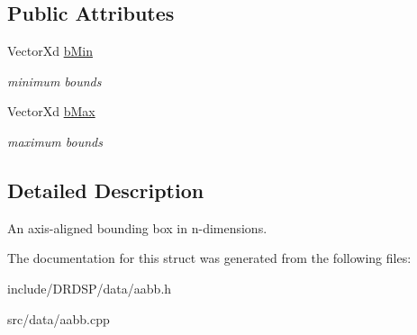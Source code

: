 \subsection*{Public Attributes}
\begin{DoxyCompactItemize}
\item 
\hypertarget{struct_d_r_d_s_p_1_1_a_a_b_b_a164c8db4daf154b8d0eb5d817849f0c1}{Vector\-Xd \hyperlink{struct_d_r_d_s_p_1_1_a_a_b_b_a164c8db4daf154b8d0eb5d817849f0c1}{b\-Min}}\label{struct_d_r_d_s_p_1_1_a_a_b_b_a164c8db4daf154b8d0eb5d817849f0c1}

\begin{DoxyCompactList}\small\item\em minimum bounds \end{DoxyCompactList}\item 
\hypertarget{struct_d_r_d_s_p_1_1_a_a_b_b_a429e3f5162a168b4611cd3b8c70150c1}{Vector\-Xd \hyperlink{struct_d_r_d_s_p_1_1_a_a_b_b_a429e3f5162a168b4611cd3b8c70150c1}{b\-Max}}\label{struct_d_r_d_s_p_1_1_a_a_b_b_a429e3f5162a168b4611cd3b8c70150c1}

\begin{DoxyCompactList}\small\item\em maximum bounds \end{DoxyCompactList}\end{DoxyCompactItemize}


\subsection{Detailed Description}
An axis-\/aligned bounding box in n-\/dimensions. 

The documentation for this struct was generated from the following files\-:\begin{DoxyCompactItemize}
\item 
include/\-D\-R\-D\-S\-P/data/aabb.\-h\item 
src/data/aabb.\-cpp\end{DoxyCompactItemize}
